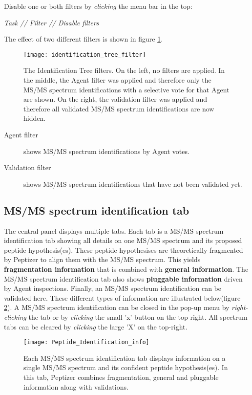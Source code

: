 \npar Disable one or both filters by \textit{clicking }the menu bar in the top:
%
\begin{center}
\textit{Task // Filter // Disable filters}	
\end{center}
\npar The effect of two different filters is shown in figure \ref{identification_tree_filter}.
%
%
\begin{figure}[t!]
\begin{center}
	\texttt{[image: identification\_tree\_filter]}
	\caption{\label{identification_tree_filter}The Identification Tree filters. On the left, no filters are applied. In the middle, the Agent filter was applied and therefore only the MS/MS spectrum identifications with a selective vote for that Agent are shown. On the right, the validation filter was applied and therefore all validated MS/MS spectrum identifications are now hidden.}
\end{center}
\end{figure}
%
\begin{description}
	\item[Agent filter] shows MS/MS spectrum identifications by  Agent votes.
	\item[Validation filter] shows MS/MS spectrum identifications that have not been validated yet.
\end{description}
\newpage
\subsection{\label{peptide_identification_tab}MS/MS spectrum identification tab}
\npar The central panel displays multiple tabs. Each tab is a MS/MS spectrum identification tab showing all details on one MS/MS spectrum and its proposed peptide hypothesis(es). These peptide hypothesises are theoretically fragmented by Peptizer to align them with the MS/MS spectrum. This yields\textbf{ fragmentation information} that is combined with \textbf{general information}. The MS/MS spectrum identification tab also shows \textbf{pluggable information} driven by Agent inspections. Finally, an MS/MS spectrum identification can be validated here.
\npar These different types of information are illustrated below(figure \ref{Peptide_Identification_info}).
\npar A MS/MS spectrum identification can be closed in the pop-up menu by \textit{right-clicking }the tab or by \textit{clicking} the small 'x' button on the top-right. All spectrum tabs can be cleared by \textit{clicking} the large 'X' on the top-right.
%
%
\begin{figure}[h!]
\begin{center}
	\texttt{[image: Peptide\_Identification\_info]}
	\caption{\label{Peptide_Identification_info} Each MS/MS spectrum identification tab displays information on a single MS/MS spectrum and its confident peptide hypothesis(es). In this tab, Peptizer combines fragmentation, general and pluggable information along with validations.}
\end{center}
\end{figure}
%
